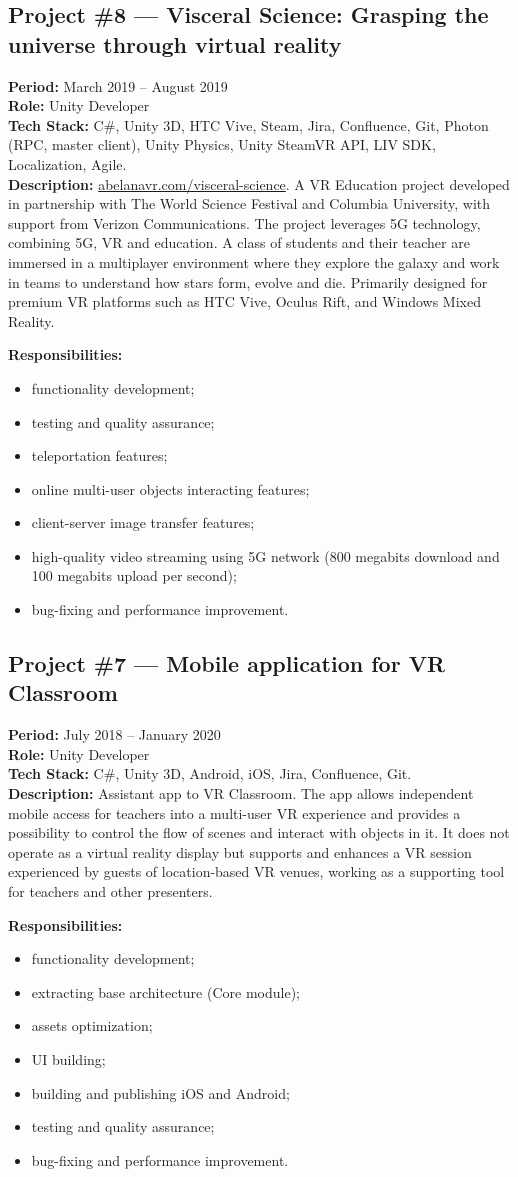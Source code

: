 \documentclass[letterpaper,11pt]{article}
\newcommand{\project}[6]{%
  \par\addvspace{20pt}%
  \noindent\begin{minipage}{\linewidth}
  \subsection*{#1}
  \textbf{Period:} #2 \\
  \textbf{Role:} #5 \\
  \textbf{Tech Stack:} #4 \\
  \textbf{Description:} #3
  \par\smallskip
  \textbf{Responsibilities:}
  \begin{itemize}[leftmargin=1.4em,itemsep=1pt,topsep=2pt,parsep=0pt]
    #6
  \end{itemize}
  \end{minipage}%
  \par\addvspace{20pt}%
}
\begin{document}
\project{Project \#8 --- Visceral Science: Grasping the universe through virtual reality}
  {March 2019 -- August 2019}
  {\href{https://www.abelanavr.com/visceral-science}{abelanavr.com/visceral-science}. A VR Education project developed in partnership with The World Science Festival and Columbia University, with support from Verizon Communications. The project leverages 5G technology, combining 5G, VR and education. A class of students and their teacher are immersed in a multiplayer environment where they explore the galaxy and work in teams to understand how stars form, evolve and die. Primarily designed for premium VR platforms such as HTC Vive, Oculus Rift, and Windows Mixed Reality.}
  {C\#, Unity 3D, HTC Vive, Steam, Jira, Confluence, Git, Photon (RPC, master client), Unity Physics, Unity SteamVR API, LIV SDK, Localization, Agile.}
  {Unity Developer}
  {
    \item functionality development;
    \item testing and quality assurance;
    \item teleportation features;
    \item online multi-user objects interacting features;
    \item client-server image transfer features;
    \item high-quality video streaming using 5G network (800 megabits download and 100 megabits upload per second);
    \item bug-fixing and performance improvement.
  }

\project{Project \#7 --- Mobile application for VR Classroom}
  {July 2018 -- January 2020}
  {Assistant app to VR Classroom. The app allows independent mobile access for teachers into a multi-user VR experience and provides a possibility to control the flow of scenes and interact with objects in it. It does not operate as a virtual reality display but supports and enhances a VR session experienced by guests of location-based VR venues, working as a supporting tool for teachers and other presenters.}
  {C\#, Unity 3D, Android, iOS, Jira, Confluence, Git.}
  {Unity Developer}
  {
    \item functionality development;
    \item extracting base architecture (Core module);
    \item assets optimization;
    \item UI building;
    \item building and publishing iOS and Android;
    \item testing and quality assurance;
    \item bug-fixing and performance improvement.
  }
\end{document}
